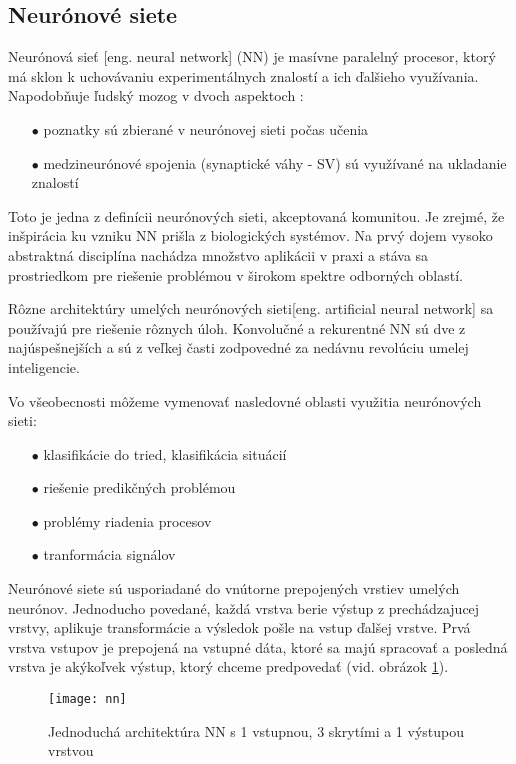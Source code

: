\subsection{Neurónové siete}
Neurónová sieť [eng. neural network] (NN) je masívne paralelný procesor, ktorý má sklon k uchovávaniu experimentálnych znalostí a ich ďalšieho využívania.
Napodobňuje ľudský mozog v dvoch aspektoch \cite{odkaz:NNIntroduction}:
\begin{enumerate}
	\item[$\bullet$] poznatky sú zbierané v neurónovej sieti počas učenia
	\item[$\bullet$] medzineurónové spojenia (synaptické váhy - SV) sú využívané na ukladanie znalostí
\end{enumerate}
Toto je jedna z definícii neurónových sieti, akceptovaná komunitou.
Je zrejmé, že inšpirácia ku vzniku NN prišla z biologických systémov.
Na prvý dojem vysoko abstraktná disciplína nachádza množstvo aplikácii v praxi a stáva sa prostriedkom pre riešenie problémou v širokom spektre odborných oblastí\cite{odkaz:NNIntroduction}.

Rôzne architektúry umelých neurónových sieti[eng. artificial neural network] sa používajú pre riešenie rôznych úloh.
Konvolučné a rekurentné NN sú dve z najúspešnejších a sú z veľkej časti zodpovedné za nedávnu revolúciu umelej inteligencie\cite{odkaz:CorrectionOfImageOrentation}.

Vo všeobecnosti môžeme vymenovať nasledovné oblasti využitia neurónových sieti\cite{odkaz:NNIntroduction}:
\begin{enumerate}
    \item[$\bullet$] klasifikácie do tried, klasifikácia situácií
    \item[$\bullet$] riešenie predikčných problémou
    \item[$\bullet$] problémy riadenia procesov
    \item[$\bullet$] tranformácia signálov
\end{enumerate}

Neurónové siete sú usporiadané do vnútorne prepojených vrstiev umelých neurónov.
Jednoducho povedané, každá vrstva berie výstup z prechádzajucej vrstvy, aplikuje transformácie a výsledok pošle na vstup ďalšej vrstve.
Prvá vrstva vstupov je prepojená na vstupné dáta, ktoré sa majú spracovať a posledná vrstva je akýkoľvek výstup, ktorý chceme predpovedať \cite{odkaz:CorrectionOfImageOrentation} (vid. obrázok \ref{pic:NNExample}).
\begin{figure}[H]
	\centering
	\texttt{[image: nn]}
	\caption{Jednoduchá architektúra NN s 1 vstupnou, 3 skrytími a 1 výstupou vrstvou\cite{odkaz:CorrectionOfImageOrentation}}
	\label{pic:NNExample}
\end{figure}

